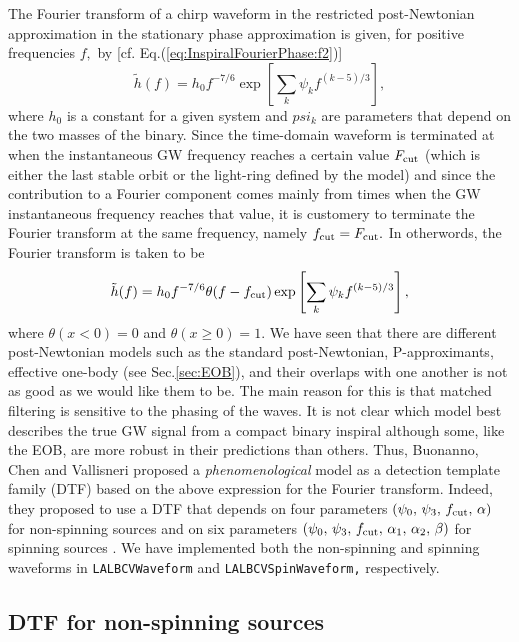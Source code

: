  The Fourier transform of a chirp waveform in the restricted post-Newtonian
 approximation in the stationary phase approximation is given, for 
 positive frequencies $f,$ by [cf. Eq.(\ref{eq:InspiralFourierPhase:f2})]
 \begin{equation}
 \tilde h(f) = h_0 f^{-7/6} \exp \left [ \sum_k \psi_k f^{(k-5)/3} \right ],
 \end{equation}
 where $h_0$ is a constant for a given system and $psi_k$ are parameters that
 depend on the two masses of the binary. Since the time-domain waveform 
 is terminated at when the instantaneous GW frequency reaches a certain value
 $F_{\rm cut}$ (which is either the last stable
 orbit or the light-ring defined by the model) and since the contribution to
 a Fourier component comes mainly from times when the GW instantaneous frequency
 reaches that value, it is customery to terminate the Fourier transform at the
 same frequency, namely $f_{\rm cut} = F_{\rm cut}.$ In otherwords, the Fourier
 transform is taken to be
 \begin{equation}
 \tilde h(f) = h_0 f^{-7/6} \theta(f-f_{\rm cut}) \exp \left [ \sum_k \psi_k f^{(k-5)/3} \right ],
 \end{equation}
 where $\theta(x<0)=0$ and $\theta(x\ge 0) =1.$ 
 We have seen that there are different post-Newtonian models such as the 
 standard post-Newtonian,
 P-approximants, effective one-body (see Sec.\ref{sec:EOB}), 
 and their overlaps with one another is not
 as good as we would like them to be. The main reason for this is that matched 
 filtering is sensitive to the phasing of the waves. It is not clear which model
 best describes the true GW signal from a compact binary inspiral although some,
 like the EOB, are more robust in their predictions than others. Thus, Buonanno,
 Chen and Vallisneri proposed \cite{BCV03,BCV03b} 
a {\it phenomenological} model as a detection template
 family (DTF) based on the above expression for the Fourier transform. Indeed, they
 proposed to use a DTF that depends on four parameters 
$(\psi_0,\, \psi_3,\, f_{\rm cut},\, \alpha)$ for non-spinning sources \cite{BCV03}
and on six parameters 
$(\psi_0,\, \psi_3,\, f_{\rm cut},\, \alpha_1,\, \alpha_2,\, \beta)$
for spinning sources \cite{BCV03b}.
We have implemented both the non-spinning and spinning waveforms
in \texttt{LALBCVWaveform} and \texttt{LALBCVSpinWaveform,} respectively. 

\subsection{DTF for non-spinning sources}

